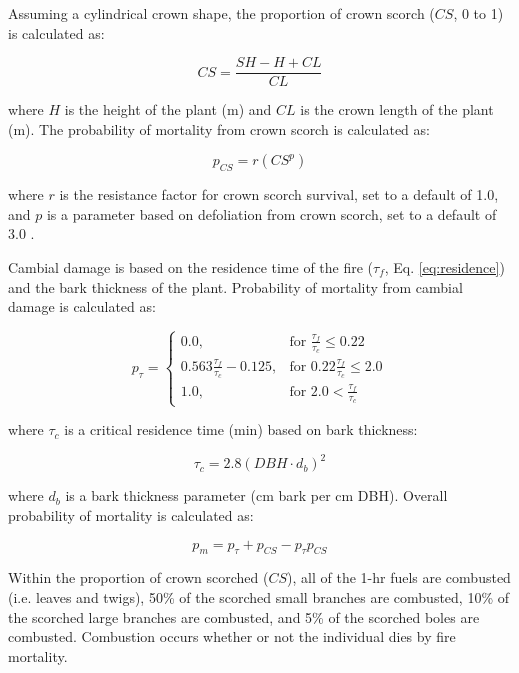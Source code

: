 \documentclass[a4paper, 12pt] {report}
\begin{document}
Assuming a cylindrical crown shape, the proportion of crown scorch ($CS$, 0 to 1) is calculated as:

\begin{equation}
	CS = \frac{SH - H + CL}{CL}
\end{equation}

where $H$ is the height of the plant (m) and $CL$ is the crown length of the plant (m). The probability of mortality from crown scorch is calculated as:

\begin{equation}
	p_{CS} = r(CS^p)
\end{equation}

where $r$ is the resistance factor for crown scorch survival, set to a default of 1.0, and $p$ is a parameter based on defoliation from crown scorch, set to a default of 3.0 \cite{thonickeInfluenceVegetationFire2010}.

Cambial damage is based on the residence time of the fire ($\tau_f$, Eq. \ref{eq:residence}) and the bark thickness of the plant. Probability of mortality from cambial damage is calculated as:

\begin{equation}
	p_{\tau} = 
	\begin{cases}
		0.0, & \text{for } \frac{\tau_f}{\tau_c} \leq 0.22  \\
		0.563\frac{\tau_f}{\tau_c} - 0.125, & \text{for } 0.22 \frac{\tau_f}{\tau_c}  \leq 2.0 \\
		1.0, & \text{for } 2.0 < \frac{\tau_f}{\tau_c} 
	\end{cases}
\end{equation}

where $\tau_c$ is a critical residence time (min) based on bark thickness:

\begin{equation}
	\tau_c = 2.8(DBH \cdot d_b)^2
\end{equation}

where $d_b$ is a bark thickness parameter (cm bark per cm DBH). Overall probability of mortality is calculated as:

\begin{equation}
	p_m = p_{\tau} + p_{CS} - p_{\tau}p_{CS}
\end{equation}


Within the proportion of crown scorched ($CS$), all of the 1-hr fuels are combusted (i.e. leaves and twigs), 50\% of the scorched small branches are combusted, 10\% of the scorched large branches are combusted, and 5\% of the scorched boles are combusted. Combustion occurs whether or not the individual dies by fire mortality. 
\end{document}
